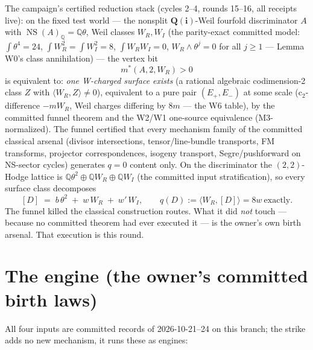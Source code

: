 \documentclass[11pt]{article}
\newcommand{\WR}{W_R}
\newcommand{\WI}{W_I}
\newcommand{\KA}{A}
\begin{document}
The campaign's certified reduction stack (cycles 2--4, rounds 15--16, all
receipts live): on the fixed test world --- the nonsplit $\mathbf{Q(i)}$-Weil
fourfold discriminator $\KA$ with $\operatorname{NS}(\KA)_{\mathbb Q} =
\mathbb Q\theta$, Weil classes $\WR, \WI$ (the parity-exact committed model:
$\int \theta^4 = 24$, $\int \WR^2 = \int \WI^2 = 8$, $\int \WR\WI = 0$,
$\WR\wedge\theta^j = 0$ for all $j \ge 1$ --- Lemma W0's class annihilation)
--- the vertex bit
\[
m^*(\KA,2,\WR) > 0
\]
is equivalent to: \emph{one W-charged surface exists} (a rational algebraic
codimension-2 class $Z$ with $\langle \WR, Z\rangle \ne 0$), equivalent to a
pure pair $(E_+,E_-)$ at some scale (c$_2$-difference $-m\WR$, Weil charges
differing by $8m$ --- the W6 table), by the committed funnel theorem and the
W2/W1 one-source equivalence (M3-normalized). The funnel certified that every
mechanism family of the committed classical arsenal (divisor intersections,
tensor/line-bundle transports, FM transforms, projector correspondences,
isogeny transport, Segre/pushforward on NS-sector cycles) generates $q = 0$
content only. On the discriminator the $(2,2)$-Hodge lattice is
$\mathbb Q\theta^2 \oplus \mathbb Q\WR \oplus \mathbb Q\WI$ (the committed
input stratification), so every surface class decomposes
\[
[D] \;=\; b\,\theta^2 \;+\; w\,\WR \;+\; w'\,\WI, \qquad
q(D) := \langle \WR, [D]\rangle = 8w \ \text{exactly}.
\]
The funnel killed the classical construction routes. What it did
\emph{not} touch --- because no committed theorem had ever executed it --- is
the owner's own birth arsenal. That execution is this round.

\section{The engine (the owner's committed birth laws)}

All four inputs are committed records of 2026-10-21--24 on this branch; the
strike adds no new mechanism, it runs these as engines:
\end{document}
